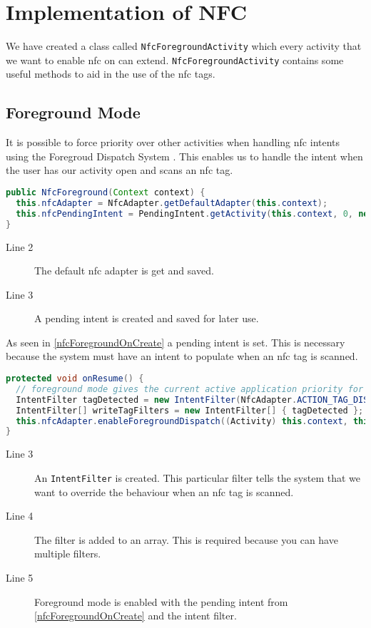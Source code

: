 \section{Implementation of NFC}
We have created a class called \lstinline|NfcForegroundActivity| which every activity that we want to enable \ac{nfc} on can extend. \lstinline|NfcForegroundActivity| contains some useful methods to aid in the use of the \ac{nfc} tags.

\subsection{Foreground Mode}
\label{sec:foeground}

It is possible to force priority over other activities when handling \ac{nfc} intents using the Foregroud Dispatch System \citep{foregroundDispatch}. This enables us to handle the intent when the user has our activity open and scans an \ac{nfc} tag.

\begin{lstlisting}[language=java, label=nfcForegroundOnCreate, caption=OnCreate]
public NfcForeground(Context context) { 
  this.nfcAdapter = NfcAdapter.getDefaultAdapter(this.context);
  this.nfcPendingIntent = PendingIntent.getActivity(this.context, 0, new Intent(this.context, ((Activity) this.context).getClass()).addFlags(Intent.FLAG_ACTIVITY_SINGLE_TOP), 0);
}
\end{lstlisting}
\begin{description}
\item[Line 2] The default \ac{nfc} adapter is get and saved.
\item[Line 3] A pending intent is created and saved for later use.
\end{description}
As seen in \autoref{nfcForegroundOnCreate} a pending intent is set. This is necessary because the system must have an intent to populate when an \ac{nfc} tag is scanned.

\begin{lstlisting}[language=java, caption=Foreground mode enabling]
protected void onResume() {
  // foreground mode gives the current active application priority for reading scanned tags
  IntentFilter tagDetected = new IntentFilter(NfcAdapter.ACTION_TAG_DISCOVERED); // filter for tags
  IntentFilter[] writeTagFilters = new IntentFilter[] { tagDetected };
  this.nfcAdapter.enableForegroundDispatch((Activity) this.context, this.nfcPendingIntent, writeTagFilters, null);
}
\end{lstlisting}
\begin{description}
\item[Line 3] An \lstinline|IntentFilter| is created. This particular filter tells the system that we want to override the behaviour when an \ac{nfc} tag is scanned.
\item[Line 4] The filter is added to an array. This is required because you can have multiple filters.
\item[Line 5] Foreground mode is enabled with the pending intent from \autoref{nfcForegroundOnCreate} and the intent filter.
\end{description}

